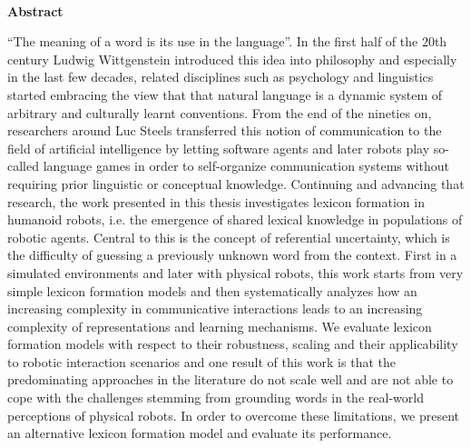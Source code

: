 

~\\



\begin{addmargin}[1.2cm]{1.2cm}
{\Large\sffamily\bfseries Abstract}
\vspace{0.5cm}

\noindent ``The meaning of a word is its use in the language''. In the
first half of the 20th century Ludwig Wittgenstein introduced this
idea into philosophy and especially in the last few decades, related
disciplines such as psychology and linguistics started embracing the
view that that natural language is a dynamic system of arbitrary and
culturally learnt conventions. From the end of the nineties on,
researchers around Luc Steels transferred this notion of communication
to the field of artificial intelligence by letting software agents and
later robots play so-called language games in order to self-organize
communication systems without requiring prior linguistic or conceptual
knowledge. Continuing and advancing that research, the work presented
in this thesis investigates lexicon formation in humanoid robots,
i.e. the emergence of shared lexical knowledge in populations of
robotic agents. Central to this is the concept of referential
uncertainty, which is the difficulty of guessing a previously unknown
word from the context. First in a simulated environments and later
with physical robots, this work starts from very simple lexicon
formation models and then systematically analyzes how an increasing
complexity in communicative interactions leads to an increasing
complexity of representations and learning mechanisms. We evaluate
lexicon formation models with respect to their robustness, scaling and
their applicability to robotic interaction scenarios and one result of
this work is that the predominating approaches in the literature do
not scale well and are not able to cope with the challenges stemming
from grounding words in the real-world perceptions of physical
robots. In order to overcome these limitations, we present an
alternative lexicon formation model and evaluate its performance.
\end{addmargin}

\cleardoublepage








